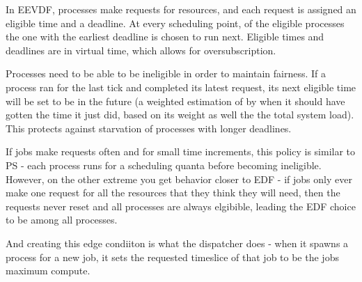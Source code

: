 
In EEVDF, processes make requests for resources, and each request is assigned an
eligible time and a deadline. At every scheduling point, of the eligible
processes the one with the earliest deadline is chosen to run next. Eligible
times and deadlines are in virtual time, which allows for oversubscription. 

Processes need to be able to be ineligible in order to maintain fairness. If a
process ran for the last tick and completed its latest request, its next
eligible time will be set to be in the future (a weighted estimation of by when
it should have gotten the time it just did, based on its weight as well the the
total system load). This protects against starvation of processes with longer
deadlines.

If jobs make requests often and for small time increments, this policy is
similar to PS - each process runs for a scheduling quanta before becoming
ineligible. However, on the other extreme you get behavior closer to EDF - if
jobs only ever make one request for all the resources that they think they will
need, then the requests never reset and all processes are always elgibible,
leading the EDF choice to be among all processes.

And creating this edge condiiton is what the dispatcher does - when it spawns a
process for a new job, it sets the requested timeslice of that job to be the
jobs maximum compute. 

